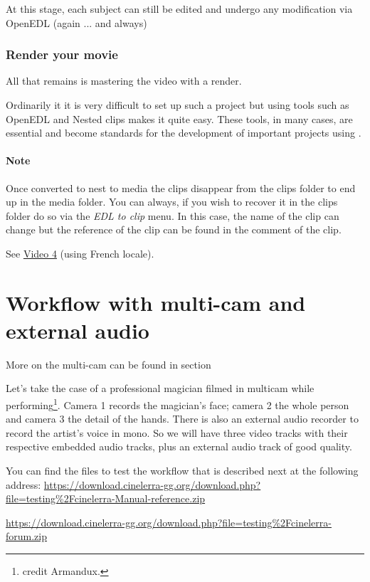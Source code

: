 At this stage, each subject can still be edited and undergo any modification via OpenEDL (again ... and always)

\subsubsection*{Render your movie}
\label{ssub:render_movie}

All that remains is mastering the video with a render.

Ordinarily it it is very difficult to set up such a project but using tools such as OpenEDL and Nested clips makes it quite easy. These tools, in many cases, are essential and become standards for the development of important projects using \CGG{}.

\paragraph{Note}

Once converted to nest to media the clips disappear from the clips folder to end up in the media folder. You can always, if you wish to recover it in the clips folder do so via the \textit{EDL to clip} menu. In this case, the name of the clip can change but the reference of the clip can be found in the comment of the clip.

See \href{https://youtu.be/bfYaBqVbdCo}{Video 4} (using French locale).

\section{Workflow with multi-cam and external audio}%
\label{sec:workflow_multicam_external_audio}

More on the multi-cam can be found in section 

Let's take the case of a professional magician filmed in multicam while performing\protect\footnote{credit Armandux.}. Camera 1 records the magician's face; camera 2 the whole person and camera 3 the detail of the hands. There is also an external audio recorder to record the artist's voice in mono. So we will have three video tracks with their respective embedded audio tracks, plus an external audio track of good quality.

You can find the files to test the workflow that is described next at the following address:
\url{https://download.cinelerra-gg.org/download.php?file=testing\%2Fcinelerra-Manual-reference.zip}
\begin{htmlonly}
\url{https://download.cinelerra-gg.org/download.php?file=testing\%2Fcinelerra-forum.zip}
\end{htmlonly}

